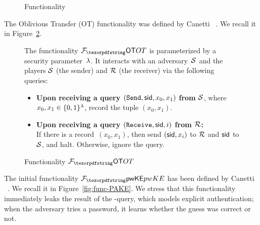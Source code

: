 \begin{figure}[htbp]
{\begin{minipage}{\linewidth-10pt}
\begin{itemize}
\end{itemize}
\end{minipage}}
\caption{Functionality \Fic} \label{functionality:IC}
\end{figure}

The Oblivious Transfer (OT) functionality was defined by Canetti \etal~\cite{STOC:CLOS02}.
We recall it in Figure~\ref{fig:func-OT}.

\begin{figure}[htbp]
  \centering
  \begin{fboxenv}
    \begin{minipage}{0.95\textwidth}
      The functionality $\Fot$ is parameterized by a security parameter~$\lambda$.
      It interacts with an adversary~$\mathcal{S}$ and the players $\mathcal{S}$ (the sender) and $\mathcal{R}$ (the receiver) via the following queries:
      \begin{itemize}
      \item
        \textbf{Upon receiving a query
        $(\texttt{Send},\mathsf{sid},x_0,x_1)$ from $\mathcal{S}$}, where $x_0,x_1\in\{0,1\}^{\lambda}$, record the tuple $(x_0,x_1)$.
      \item
        \textbf{Upon receiving a query
        $(\texttt{Receive},\mathsf{sid},i)$ from $\mathcal{R}$:} \\
        If there is a record~$(x_0,x_1)$, then send $(\mathsf{sid},x_i)$ to $\mathcal{R}$ and $\mathsf{sid}$ to $\mathcal{S}$, and halt.
        Otherwise, ignore the query.
      \end{itemize}
    \end{minipage}
  \end{fboxenv}
  \caption{Functionality $\Fot$}\label{fig:func-OT}
\end{figure}

The initial \PAKE functionality $\FpwKE$ has been defined by Canetti \etal~\cite{EC:CHKLM05}. We recall it in Figure~\ref{fig:func-PAKE}. We stress that this functionality immediately leaks the result of the \TestPwd-query, which models explicit authentication; when the adversary tries a password, it learns whether the guess was correct or not.

